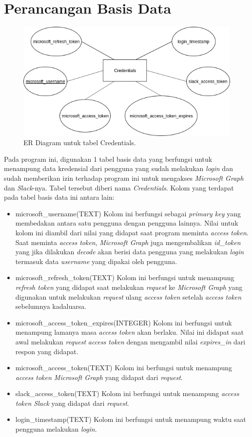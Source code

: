 \section{Perancangan Basis Data}
\begin{figure}[h]
  \includegraphics[width=15cm]{./Gambar/ERD.png}
  \centering
  \caption{ER Diagram untuk tabel Credentials.}
  \label{fig:erd}
\end{figure}
Pada program ini, digunakan 1 tabel basis data yang berfungsi untuk menampung data kredensial dari pengguna yang sudah melakukan \textit{login} dan sudah memberikan izin terhadap program ini untuk mengakses \textit{Microsoft Graph} dan \textit{Slack}-nya. Tabel tersebut diberi nama \textit{Credentials}. Kolom yang terdapat pada tabel basis data ini antara lain:
\begin{itemize}
    \item microsoft\_username(TEXT)
    Kolom ini berfungsi sebagai \textit{primary key} yang membedakan antara satu pengguna dengan pengguna lainnya. Nilai untuk kolom ini diambil dari nilai yang didapat saat program meminta \textit{access token}. Saat meminta \textit{access token}, \textit{Microsoft Graph} juga mengembalikan \textit{id\_token} yang jika dilakukan \textit{decode} akan berisi data pengguna yang melakukan \textit{login} termasuk data \textit{username} yang dipakai oleh pengguna. 
    \item microsoft\_refresh\_token(TEXT)
    Kolom ini berfungsi untuk menampung \textit{refresh token} yang didapat saat melakukan \textit{request} ke \textit{Microsoft Graph} yang digunakan untuk melakukan \textit{request} ulang \textit{access token} setelah \textit{access token} sebelumnya kadaluarsa. 
    \item microsoft\_access\_token\_expires(INTEGER)
    Kolom ini berfungsi untuk menampung lamanya masa \textit{access token} akan berlaku. Nilai ini didapat saat awal melakukan \textit{request} \textit{access token} dengan mengambil nilai \textit{expires\_in} dari respon yang didapat. 
    \item microsoft\_access\_token(TEXT)
    Kolom ini berfungsi untuk menampung \textit{access token Microsoft Graph} yang didapat dari \textit{request}. 
    \item slack\_access\_token(TEXT)
    Kolom ini berfungsi untuk menampung \textit{access token Slack} yang didapat dari \textit{request}. 
    \item login\_timestamp(TEXT)
    Kolom ini berfungsi untuk menampung waktu saat pengguna melakukan \textit{login}. 
\end{itemize}

